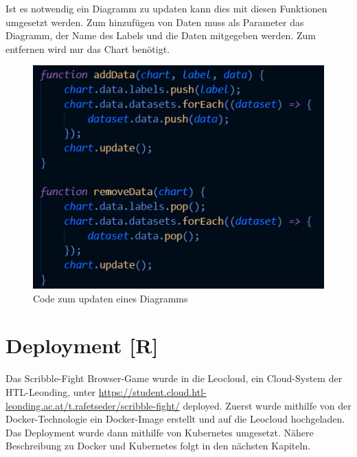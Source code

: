 Ist es notwendig ein Diagramm zu updaten kann dies mit diesen Funktionen umgesetzt werden. Zum hinzufügen
von Daten muss als Parameter das Diagramm, der Name des Labels und die Daten mitgegeben werden. Zum entfernen wird nur das Chart benötigt.
\begin{figure}[H]
    \centering
    \includegraphics[scale=1]{pics/updateChart.png}
    \caption{Code zum updaten eines Diagramms}
\end{figure}




\section{Deployment [R]}
Das Scribble-Fight Browser-Game wurde in die Leocloud, ein Cloud-System der HTL-Leonding, unter \url{https://student.cloud.htl-leonding.ac.at/t.rafetseder/scribble-fight/} deployed.
Zuerst wurde mithilfe von der Docker-Technologie ein Docker-Image erstellt und auf die Leocloud hochgeladen. Das Deployment wurde dann mithilfe von Kubernetes umgesetzt.
Nähere Beschreibung zu Docker und Kubernetes folgt in den nächsten Kapiteln.
